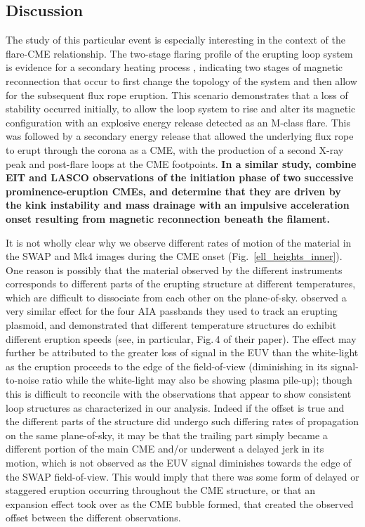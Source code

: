 \documentclass[namedreferences]{solarphysics}
\begin{document}
\begin{article}
\section{Discussion}
\label{sect:discussion}

The study of this particular event is especially interesting in the context of the flare-CME relationship. The two-stage flaring profile of the erupting loop system is evidence for a secondary heating process \cite{2012ApJ...746L...5S}, indicating two stages of magnetic reconnection that occur to first change the topology of the system and then allow for the subsequent flux rope eruption. This scenario demonstrates that a loss of stability occurred initially, to allow the loop system to rise and alter its magnetic configuration with an explosive energy release detected as an M-class flare. This was followed by a secondary energy release that allowed the underlying flux rope to erupt through the corona as a CME, with the production of a second X-ray peak and post-flare loops at the CME footpoints. {\bf In a similar study,  combine EIT and LASCO observations of the initiation phase of two successive prominence-eruption CMEs, and determine that they are driven by the kink instability and mass drainage with an impulsive acceleration onset resulting from magnetic reconnection beneath the filament.}




It is not wholly clear why we observe different rates of motion of the material in the SWAP and Mk4 images during the CME onset (Fig.~\ref{ell_heights_inner}). One reason is possibly that the material observed by the different instruments corresponds to different parts of the erupting structure at different temperatures, which are difficult to dissociate from each other on the plane-of-sky.  observed a very similar effect for the four AIA passbands they used to track an erupting plasmoid, and demonstrated that different temperature structures do exhibit different eruption speeds (see, in particular, Fig.\,4 of their paper). The effect may further be attributed to the greater loss of signal in the EUV than the white-light as the eruption proceeds to the edge of the field-of-view (diminishing in its signal-to-noise ratio while the white-light may also be showing plasma pile-up); though this is difficult to reconcile with the observations that appear to show consistent loop structures as characterized in our analysis. Indeed if the offset is true and the different parts of the structure did undergo such differing rates of propagation on the same plane-of-sky, it may be that the trailing part simply became a different portion of the main CME and/or underwent a delayed jerk in its motion, which is not observed as the EUV signal diminishes towards the edge of the SWAP field-of-view. This would imply that there was some form of delayed or staggered eruption occurring throughout the CME structure, or that an expansion effect took over as the CME bubble formed, that created the observed offset between the different observations. 




\end{article}
\end{document}
